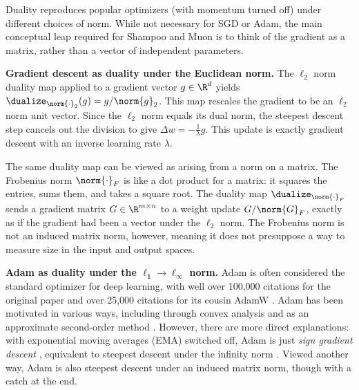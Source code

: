 Duality reproduces popular optimizers (with momentum turned off) under different choices of norm. While not necessary for SGD or Adam, the main conceptual leap required for Shampoo and Muon is to think of the gradient as a matrix, rather than a vector of independent parameters.

\vspace{1em}

\textbf{Gradient descent as duality under the Euclidean norm.} The $\ell_2$ norm duality map applied to a gradient vector $g \in \R^d$ yields $\dualize_{\norm{\cdot}_2}(g) = g/\norm{g}_2$. This map rescales the gradient to be an $\ell_2$ norm unit vector. Since the $\ell_2$ norm equals its dual norm, the steepest descent step cancels out the division to give $\Delta w = -\tfrac{1}{\lambda} g$. This update is exactly gradient descent with an inverse learning rate $\lambda$.

The same duality map can be viewed as arising from a norm on a matrix. The Frobenius norm $\norm{\cdot}_F$ is like a dot product for a matrix: it squares the entries, sums them, and takes a square root. The duality map $\dualize_{\norm{\cdot}_F}$ sends a gradient matrix $G \in \R^{m \times n}$ to a weight update $G / \norm{G}_F$, exactly as if the gradient had been a vector under the $\ell_2$ norm. The Frobenius norm is not an induced matrix norm, however, meaning it does not presuppose a way to measure size in the input and output spaces.

\vspace{1em}

\textbf{Adam as duality under the $\bm{\ell_1 \to \ell_\infty}$ norm.} Adam is often considered the standard optimizer for deep learning, with well over 100,000 citations for the original paper \citep{kingma_adam:_2015} and over 25,000 citations for its cousin AdamW \citep{loshchilov2019adamw}. Adam has been motivated in various ways, including through convex analysis \citep{kingma_adam:_2015} and as an approximate second-order method \citep{sun-and-spall}. However, there are more direct explanations: with exponential moving averages (EMA) switched off, Adam is just \textit{sign gradient descent} \citep{pmlr-v80-balles18a,signum}, equivalent to steepest descent under the infinity norm \citep{spectral-descent-2}. Viewed another way, Adam is also steepest descent under an induced matrix norm, though with a catch at the end.


